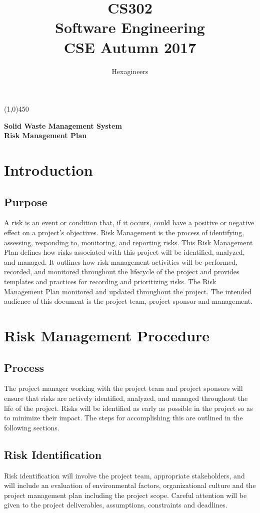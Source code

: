 \documentclass{article}
\title{\textbf{CS302}\\\HUGE Software Engineering\\
\LARGE CSE\hspace{\labelsep}\textbullet\hspace{\labelsep} Autumn 2017
}
\author{Hexagineers}
\begin{document}
\maketitle
\line(1,0){450}

\begin{center}
\Huge\textbf{Solid Waste Management System}\\
\Large \textbf{Risk Management Plan}

\end{center}
\newpage
\tableofcontents
\newpage
\section{Introduction}
\subsection{Purpose}
A risk is an event or condition that, if it occurs, could have a positive or negative effect on a project’s objectives. Risk Management is the process of identifying, assessing, responding to, monitoring, and reporting risks. This Risk Management Plan defines how risks associated with this project will be identified, analyzed, and managed. It outlines how risk management activities will be performed, recorded, and monitored throughout the lifecycle of the project and provides templates and practices for recording and prioritizing risks.
The Risk Management Plan monitored and updated throughout the project.  
The intended audience of this document is the project team, project sponsor and management.

\section{Risk Management Procedure}
\subsection{Process}
The project manager working with the project team and project sponsors will ensure that risks are actively identified, analyzed, and managed throughout the life of the project.  Risks will be identified as early as possible in the project so as to minimize their impact.  The steps for accomplishing this are outlined in the following sections.

\subsection{Risk Identification}
Risk identification will involve the project team, appropriate stakeholders, and will include an evaluation of environmental factors, organizational culture and the project management plan including the project scope.  Careful attention will be given to the project deliverables, assumptions, constraints and deadlines.
\end{document}
